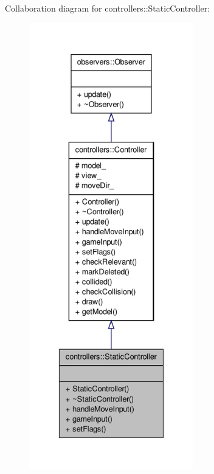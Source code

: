 \-Collaboration diagram for controllers\-:\-:\-Static\-Controller\-:\nopagebreak
\begin{figure}[H]
\begin{center}
\leavevmode
\includegraphics[height=550pt]{de/d96/classcontrollers_1_1StaticController__coll__graph}
\end{center}
\end{figure}
